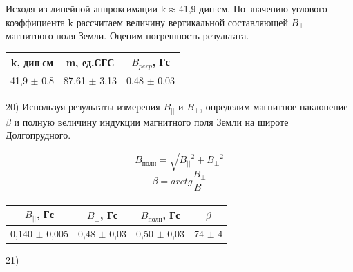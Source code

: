 \documentclass[a4paper,12pt]{article}
\begin{document}

Исходя из линейной аппроксимации k$\approx$41,9 дин$\cdot$см. По значению углового коэффициента k рассчитаем величину вертикальной составляющей $B_{\perp}$ магнитного поля Земли. Оценим погрешность результата.

\begin{center}
\begin{tabular}{|c|c|c|}
	\hline
	k, дин$\cdot$см & m, ед.СГС & $B_{perp}$, Гс \\
	\hline
	41,9 $\pm$ 0,8 & 87,61 $\pm$ 3,13 & 0,48 $\pm$ 0,03 \\
	\hline
\end{tabular}
\end{center}

20) Используя результаты измерения $B_{||}$ и $B_{\perp}$, определим магнитное наклонение $\beta$ и полную величину индукции магнитного поля Земли на широте Долгопрудного.

$$ B_{полн} = \sqrt{{B_{||}}^2+{B_{\perp}}^2} $$
$$ \beta = arctg\frac{B_{\perp}}{B_{||}}$$

\begin{center}
\begin{tabular}{|c|c|c|c|}
	\hline
	$B_{||}$, Гс & $B_{\perp}$, Гс & $B_{полн}$, Гс & $\beta$ \\
	\hline
	0,140 $\pm$ 0,005 & 0,48 $\pm$ 0,03 & 0,50 $\pm$ 0,03 & 74 $\pm$ 4\\
	\hline
\end{tabular}
\end{center}

21) 
\end{document}
